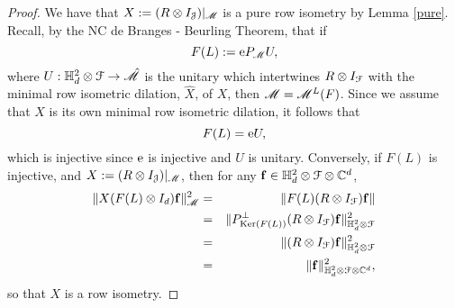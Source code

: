 \documentclass[11pt]{article}
\newcommand{\ba}{\begin{eqnarray}}
\newcommand{\ea}{\end{eqnarray}}
\newcommand{\nn}{\nonumber}
\newcommand{\mr}{\ensuremath{\mathrm}}
\newcommand{\scr}{\ensuremath{\mathscr}}
\newcommand{\mbf}{\ensuremath{\mathbf}}
\newcommand{\mc}{\ensuremath{\mathcal}}
\def\C{\mathbb{C}}
\def\bH{\mathbb{H}}
\newcommand{\J}{\ensuremath{\mathcal{J} }}
\renewcommand{\ker}[1]{\ensuremath{\mathrm{Ker} \left( {#1} \right) }}
\numberwithin{equation}{section}
\numberwithin{subsection}{section}
\theoremstyle{definition}
\begin{document}
\begin{proof} 
We have that $X:= (R \otimes I _\J) | _\scr{M}$ is a pure row isometry by Lemma \ref{pure}.  Recall, by the NC de Branges - Beurling Theorem, that if
$$ F(L) := \mr{e} P _\scr{M} U, $$ where $U : \bH ^2 _d \otimes \mc{F} \rightarrow \hat{\scr{M}}$ is the unitary which intertwines $R \otimes I _\mc{F}$ with the minimal row isometric dilation, $\hat{X}$, of $X$, then $\scr{M} = \scr{M} ^L (F)$. Since we assume that $X$ is its own minimal row isometric dilation, it follows that
$$ F(L) = \mr{e} U, $$ which is injective since $\mr{e}$ is injective and $U$ is unitary.  Conversely, if $F(L)$ is injective, and $X := (R \otimes I_\J) | _\scr{M}$, then for any $\mbf{f}  \in \bH ^2 _d \otimes \mc{F} \otimes \C ^d$, 
\ba \| X (F(L) \otimes I_d) \mbf{f} \| ^2 _\scr{M} & =&  \| F(L) (R \otimes I_\mc{F}) \mbf{f} \| 
\nn \\
& = & \| P _{\ker{F(L)}} ^\perp (R \otimes I_\mc{F} ) \mbf{f} \| ^2 _{\bH ^2 _d\otimes \mc{F}} \nn \\
& = & \| (R \otimes I_\mc{F}) \mbf{f} \| ^2 _{\bH ^2 _d \otimes \mc{F}} \nn \\
& = & \| \mbf{f} \| ^2 _{\bH ^2 _d \otimes \mc{F} \otimes \C ^d}, \nn \ea so that $X$ is a row isometry.
\end{proof}
\end{document}
